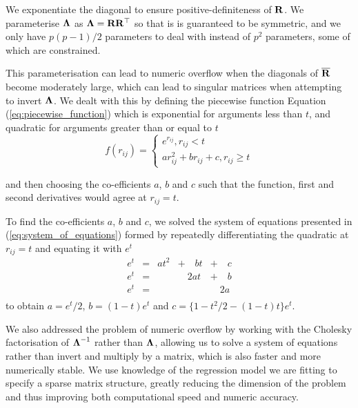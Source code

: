 \noindent We exponentiate the diagonal to ensure positive-definiteness of ${\bf R}$. We parameterise ${\boldsymbol \Lambda}$
as ${\boldsymbol \Lambda} = {\bf R} {\bf R}^\top$ so that is is guaranteed to be symmetric, and we only have $p(p-1)/2$ 
parameters to deal with instead of $p^2$ parameters, some of which are constrained. 

This parameterisation can lead to numeric overflow when the diagonals of $\overline{{\bf R}}$ become moderately
large, which can lead to singular matrices when attempting to invert ${\boldsymbol \Lambda}$. We dealt with this by
defining the piecewise function Equation (\ref{eq:piecewise_function}) which is exponential for arguments less
than $t$, and quadratic for arguments greater than or equal to $t$
\begin{equation}
\label{eq:piecewise_function}
f(r_{ij}) =
\begin{cases}
	e^{r_{ij}}, r_{ij} < t                   \\
	a r_{ij}^2 + b r_{ij} + c, r_{ij} \geq t 
\end{cases}
\end{equation}

\noindent and then choosing the co-efficients $a$, $b$ and $c$ such that the function, first and second
derivatives would agree at $r_{ij} = t$.

To find the co-efficients $a$, $b$ and $c$, we solved the system of equations presented in
(\ref{eq:system_of_equations}) formed by repeatedly  differentiating the quadratic at $r_{ij} =  t$ and equating
it with $e^t$
\begin{equation}
\label{eq:system_of_equations}
\begin{array}{lllll}
	e^t & = & a t^2 & + \quad b t & + \quad c \\
	e^t & = &       & \quad 2a t  & + \quad b \\
	e^t & = &       &             & \quad 2a  \\
\end{array}
\end{equation}
\noindent to obtain $a = e^t / 2$, $b = (1 - t) e^t$ and $c = \{1 - t^2/2 - (1 - t) t\} e^t$.

We also addressed the problem of numeric overflow by working with the Cholesky factorisation of ${\boldsymbol \Lambda}^{-1}$
rather than ${\boldsymbol \Lambda}$, allowing us to solve a system of equations rather than invert and multiply by a
matrix, which is also faster and more numerically stable. We use knowledge of the regression  model we are
fitting to specify a sparse matrix structure, greatly reducing the dimension of   the problem and thus
improving both computational speed and numeric accuracy.


